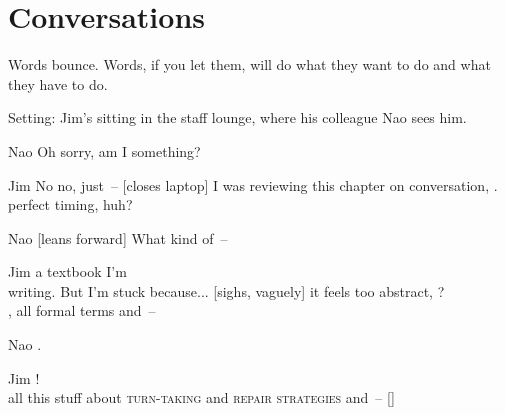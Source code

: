 \chapter{Conversations} \label{ch:conversations}

\epigraph{Words bounce. Words, if you let them, will do what they want to do and what they have to do.}{}

\begin{adjustwidth}{0pt}{1.1in} 
\setlength{\marginparwidth}{1.6in}
\setlength{\marginparsep}{-0.8in}
\noindent
Setting: Jim's sitting in the staff lounge, where his colleague Nao sees him.

\begin{sloppypar}
\begin{dialogue}
\item[Nao] Oh sorry, am I  something?

\item[Jim] No no, just~-- [closes laptop] I was reviewing this chapter on conversation, . \\ perfect timing, huh?

\item[Nao] [leans forward]  What kind of~-- 

\item[Jim] \hfill{} a textbook I'm\\ writing. But I'm stuck because... [sighs, vaguely] it feels too abstract, ? \\, all formal terms and~-- 

\item[Nao] \hspace{3cm} .\\

\item[Jim] ! \\ all this stuff about \textsc{turn-taking} and \textsc{repair strategies} and~-- []


\end{dialogue}
\end{sloppypar}
\end{adjustwidth}
